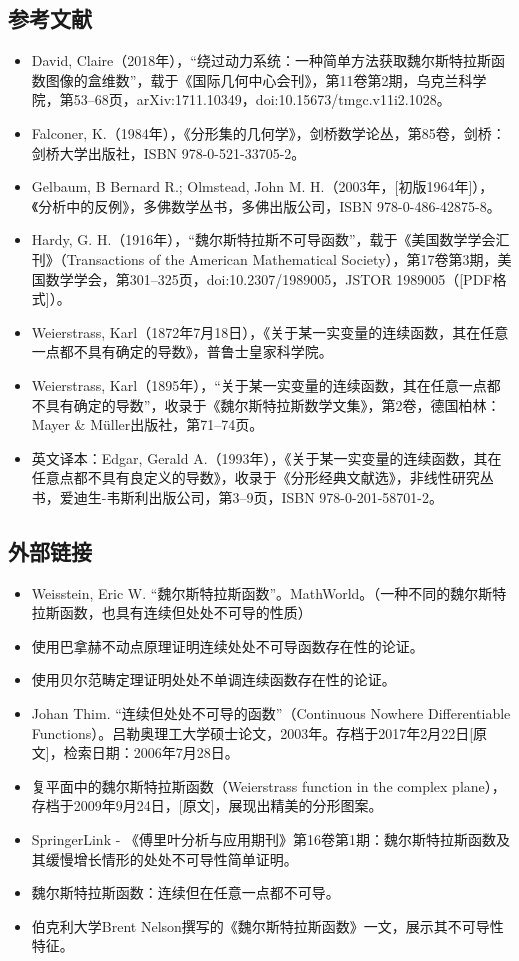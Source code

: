 \subsection{参考文献}
\begin{itemize}
\item David, Claire（2018年），“绕过动力系统：一种简单方法获取魏尔斯特拉斯函数图像的盒维数”，载于《国际几何中心会刊》，第11卷第2期，乌克兰科学院，第53–68页，arXiv:1711.10349，doi:10.15673/tmgc.v11i2.1028。
\item Falconer, K.（1984年），《分形集的几何学》，剑桥数学论丛，第85卷，剑桥：剑桥大学出版社，ISBN 978-0-521-33705-2。
\item Gelbaum, B Bernard R.; Olmstead, John M. H.（2003年，[初版1964年]），《分析中的反例》，多佛数学丛书，多佛出版公司，ISBN 978-0-486-42875-8。
\item Hardy, G. H.（1916年），“魏尔斯特拉斯不可导函数”，载于《美国数学学会汇刊》（Transactions of the American Mathematical Society），第17卷第3期，美国数学学会，第301–325页，doi:10.2307/1989005，JSTOR 1989005（[PDF格式]）。
\item Weierstrass, Karl（1872年7月18日），《关于某一实变量的连续函数，其在任意一点都不具有确定的导数》，普鲁士皇家科学院。
\item Weierstrass, Karl（1895年），“关于某一实变量的连续函数，其在任意一点都不具有确定的导数”，收录于《魏尔斯特拉斯数学文集》，第2卷，德国柏林：Mayer & Müller出版社，第71–74页。
\item 英文译本：Edgar, Gerald A.（1993年），《关于某一实变量的连续函数，其在任意点都不具有良定义的导数》，收录于《分形经典文献选》，非线性研究丛书，爱迪生-韦斯利出版公司，第3–9页，ISBN 978-0-201-58701-2。
\end{itemize}
\subsection{外部链接}
\begin{itemize}
\item Weisstein, Eric W. “魏尔斯特拉斯函数”。MathWorld。（一种不同的魏尔斯特拉斯函数，也具有连续但处处不可导的性质）
\item 使用巴拿赫不动点原理证明连续处处不可导函数存在性的论证。
\item 使用贝尔范畴定理证明处处不单调连续函数存在性的论证。
\item Johan Thim. “连续但处处不可导的函数”（Continuous Nowhere Differentiable Functions）。吕勒奥理工大学硕士论文，2003年。存档于2017年2月22日[原文]，检索日期：2006年7月28日。
\item 复平面中的魏尔斯特拉斯函数（Weierstrass function in the complex plane），存档于2009年9月24日，[原文]，展现出精美的分形图案。
\item SpringerLink - 《傅里叶分析与应用期刊》第16卷第1期：魏尔斯特拉斯函数及其缓慢增长情形的处处不可导性简单证明。
\item 魏尔斯特拉斯函数：连续但在任意一点都不可导。
\item 伯克利大学Brent Nelson撰写的《魏尔斯特拉斯函数》一文，展示其不可导性特征。
\end{itemize}
